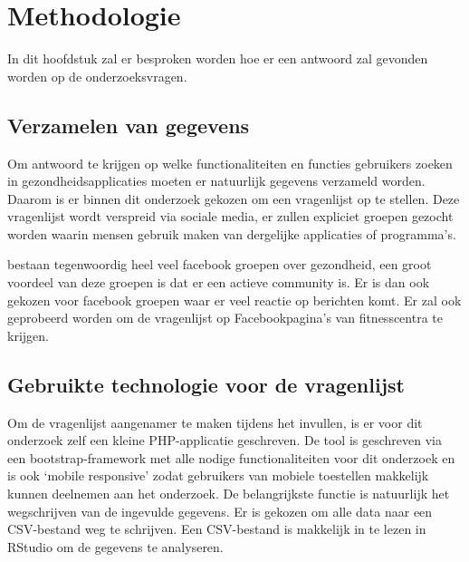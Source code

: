 \chapter{Methodologie}
\label{ch:methodologie}


In dit hoofdstuk zal er besproken worden hoe er een antwoord zal gevonden worden op de onderzoeksvragen. 

\section{Verzamelen van gegevens}
\label{sec:verzamelen}

Om antwoord te krijgen op welke functionaliteiten en functies gebruikers zoeken in gezondheidsapplicaties moeten er natuurlijk gegevens verzameld worden. Daarom is er binnen dit onderzoek gekozen om een vragenlijst op te stellen. Deze vragenlijst wordt verspreid via sociale media, er zullen expliciet groepen gezocht worden waarin mensen gebruik maken van dergelijke applicaties of programma’s. 

bestaan tegenwoordig heel veel facebook groepen over gezondheid, een groot voordeel van deze groepen is dat er een actieve community is. Er is dan ook gekozen voor facebook groepen waar er veel reactie op berichten komt. Er zal ook geprobeerd worden om de vragenlijst op Facebookpagina’s van fitnesscentra te krijgen.

\section{Gebruikte technologie voor de vragenlijst}
\label{sec:gebruikte-technologie}

Om de vragenlijst aangenamer te maken tijdens het invullen, is er voor dit onderzoek zelf een kleine PHP-applicatie geschreven. De tool is geschreven via een bootstrap-framework met alle nodige functionaliteiten voor dit onderzoek en is ook ‘mobile responsive’ zodat gebruikers van mobiele toestellen makkelijk kunnen deelnemen aan het onderzoek. De belangrijkste functie is natuurlijk het wegschrijven van de ingevulde gegevens. Er is gekozen om alle data naar een CSV-bestand weg te schrijven. Een CSV-bestand is makkelijk in te lezen in RStudio om de gegevens te analyseren.

